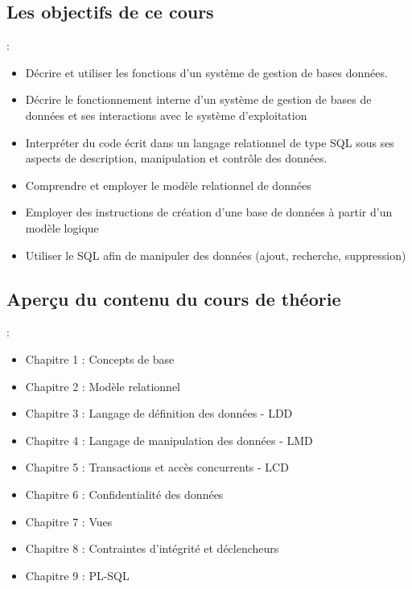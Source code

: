 \documentclass[10pt]{beamer}
\begin{document}
\subsection{Les objectifs de ce cours}
\begin{frame}{\secname : \subsecname}
    \begin{itemize}
        \item Décrire et utiliser les fonctions d’un système de gestion de bases données.
        \item Décrire le fonctionnement interne d’un système de gestion de bases de données et ses interactions avec le système d’exploitation
        \item Interpréter du code écrit dans un langage relationnel de type SQL sous ses aspects de description, manipulation et contrôle des données.
        \item Comprendre et employer le modèle relationnel de données
        \item Employer des instructions de création d'une base de données à partir d’un modèle logique
        \item Utiliser le SQL afin de manipuler des données (ajout, recherche, suppression)
    \end{itemize}
\end{frame}
\subsection{Aperçu du contenu du cours de théorie}
\begin{frame}{\secname : \subsecname}
    \begin{itemize}
        \item Chapitre 1 : Concepts de base
        \item Chapitre 2 : Modèle relationnel
        \item Chapitre 3 : Langage de définition des données - LDD
        \item Chapitre 4 : Langage de manipulation des données - LMD
        \item Chapitre 5 : Transactions et accès concurrents - LCD
        \item Chapitre 6 : Confidentialité des données
        \item Chapitre 7 : Vues
        \item Chapitre 8 : Contraintes d'intégrité et déclencheurs
        \item Chapitre 9 : PL-SQL
    \end{itemize}
\end{frame}
\end{document}
